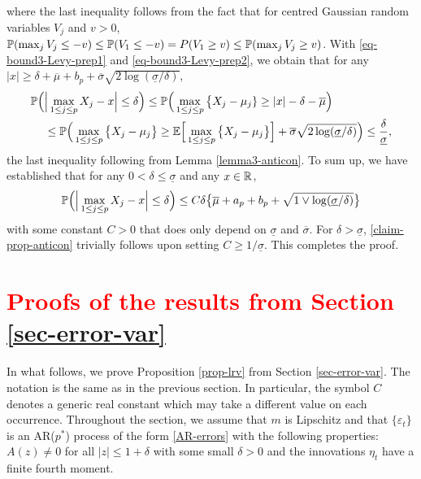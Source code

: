 where the last inequality follows from the fact that for centred Gaussian random variables $V_j$ and $v > 0$, $\mathbb{P}(\max_j V_j \le -v) \le \mathbb{P}(V_1 \le -v) = P(V_1 \ge v) \le \mathbb{P}(\max_j V_j \ge v)$. With \eqref{eq-bound3-Levy-prep1} and \eqref{eq-bound3-Levy-prep2}, we obtain that for any $|x| \ge \delta + \overline{\mu} + b_p + \overline{\sigma}\sqrt{2\log(\underline{\sigma}/\delta)}$,
\begin{align*} 
\mathbb{P} \Big( & \Big| \max_{1 \le j \le p} X_j - x \Big| \le \delta \Big) \le \mathbb{P} \Big( \max_{1 \le j \le p} \big\{ X_j - \mu_j \} \ge |x| - \delta - \overline{\mu} \Big) \\
 & \le \mathbb{P} \Big( \max_{1 \le j \le p} \big\{ X_j - \mu_j \big\} \ge \mathbb{E} \Big[ \max_{1 \le j \le p} \big\{ X_j-\mu_j \big\} \Big] + \overline{\sigma} \sqrt{2\log(\underline{\sigma}/\delta)} \Big) \le \frac{\delta}{\underline{\sigma}}, 
\end{align*}
the last inequality following from Lemma \ref{lemma3-anticon}. To sum up, we have established that for any $0 < \delta \le \underline{\sigma}$ and any $x \in \mathbb{R}$, 
\begin{equation}\label{claim-prop-anticon}
\mathbb{P} \Big( \Big| \max_{1 \le j \le p} X_j - x \Big| \le \delta \Big) \le C \delta \big\{ \overline{\mu} + a_p + b_p + \sqrt{1 \vee \log(\underline{\sigma}/\delta)} \big\} 
\end{equation}
with some constant $C > 0$ that does only depend on $\underline{\sigma}$ and $\overline{\sigma}$. For $\delta > \underline{\sigma}$, \eqref{claim-prop-anticon} trivially follows upon setting $C \ge 1/\underline{\sigma}$. This completes the proof. 



\section{\textcolor{red}{Proofs of the results from Section \ref{sec-error-var}}}\label{sec-supp-proofs2}


In what follows, we prove Proposition \ref{prop-lrv} from Section \ref{sec-error-var}. The notation is the same as in the previous section. In particular, the symbol $C$ denotes a generic real constant which may take a different value on each occurrence. Throughout the section, we assume that $m$ is Lipschitz and that $\{\varepsilon_t\}$ is an AR($p^*$) process of the form \eqref{AR-errors} with the following properties: $A(z) \ne 0$ for all $|z| \le 1 + \delta$ with some small $\delta > 0$ and the innovations $\eta_t$ have a finite fourth moment. 




